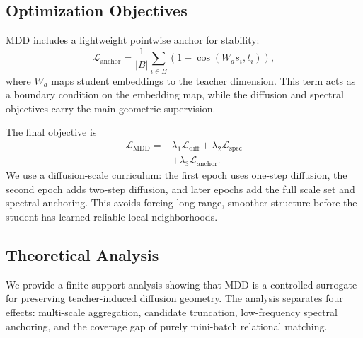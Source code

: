 \subsection{Optimization Objectives}

MDD includes a lightweight pointwise anchor for stability:
\begin{equation}
    \mathcal{L}_{\mathrm{anchor}}
    =
    \frac{1}{|B|}
    \sum_{i\in B}
    \left(1-\cos(W_a s_i,t_i)\right),
\end{equation}
where $W_a$ maps student embeddings to the teacher dimension. This term acts as a boundary condition on the embedding map, while the diffusion and spectral objectives carry the main geometric supervision.

The final objective is
\begin{equation}
\begin{aligned}
    \mathcal{L}_{\mathrm{MDD}}
    ={}&
    \lambda_{1}\mathcal{L}_{\mathrm{diff}}
    +
    \lambda_{2}\mathcal{L}_{\mathrm{spec}}
    \\
    &+
    \lambda_{3}\mathcal{L}_{\mathrm{anchor}}.
\end{aligned}
\end{equation}
We use a diffusion-scale curriculum: the first epoch uses one-step diffusion, the second epoch adds two-step diffusion, and later epochs add the full scale set and spectral anchoring. This avoids forcing long-range, smoother structure before the student has learned reliable local neighborhoods.

\subsection{Theoretical Analysis}

We provide a finite-support analysis showing that MDD is a controlled surrogate for preserving teacher-induced diffusion geometry. The analysis separates four effects: multi-scale aggregation, candidate truncation, low-frequency spectral anchoring, and the coverage gap of purely mini-batch relational matching.

